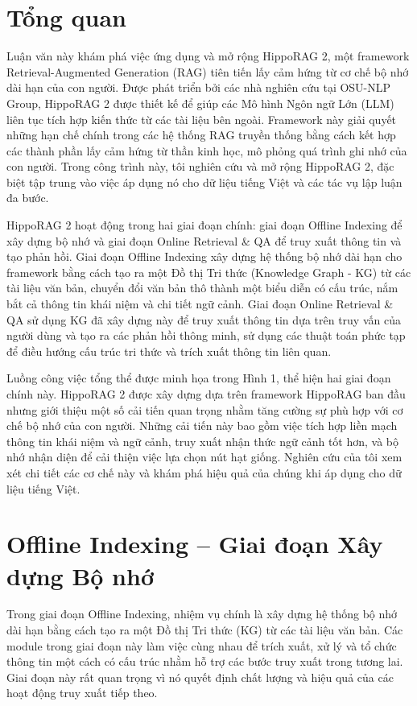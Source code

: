 \documentclass[../main.tex]{subfiles}
\begin{document}
\section{Tổng quan}
Luận văn này khám phá việc ứng dụng và mở rộng HippoRAG 2, một framework Retrieval-Augmented Generation (RAG) tiên tiến lấy cảm hứng từ cơ chế bộ nhớ dài hạn của con người. Được phát triển bởi các nhà nghiên cứu tại OSU-NLP Group, HippoRAG 2 được thiết kế để giúp các Mô hình Ngôn ngữ Lớn (LLM) liên tục tích hợp kiến thức từ các tài liệu bên ngoài. Framework này giải quyết những hạn chế chính trong các hệ thống RAG truyền thống bằng cách kết hợp các thành phần lấy cảm hứng từ thần kinh học, mô phỏng quá trình ghi nhớ của con người. Trong công trình này, tôi nghiên cứu và mở rộng HippoRAG 2, đặc biệt tập trung vào việc áp dụng nó cho dữ liệu tiếng Việt và các tác vụ lập luận đa bước.

HippoRAG 2 hoạt động trong hai giai đoạn chính: giai đoạn Offline Indexing để xây dựng bộ nhớ và giai đoạn Online Retrieval \& QA để truy xuất thông tin và tạo phản hồi. Giai đoạn Offline Indexing xây dựng hệ thống bộ nhớ dài hạn cho framework bằng cách tạo ra một Đồ thị Tri thức (Knowledge Graph - KG) từ các tài liệu văn bản, chuyển đổi văn bản thô thành một biểu diễn có cấu trúc, nắm bắt cả thông tin khái niệm và chi tiết ngữ cảnh. Giai đoạn Online Retrieval \& QA sử dụng KG đã xây dựng này để truy xuất thông tin dựa trên truy vấn của người dùng và tạo ra các phản hồi thông minh, sử dụng các thuật toán phức tạp để điều hướng cấu trúc tri thức và trích xuất thông tin liên quan.

Luồng công việc tổng thể được minh họa trong Hình 1, thể hiện hai giai đoạn chính này. HippoRAG 2 được xây dựng dựa trên framework HippoRAG ban đầu nhưng giới thiệu một số cải tiến quan trọng nhằm tăng cường sự phù hợp với cơ chế bộ nhớ của con người. Những cải tiến này bao gồm việc tích hợp liền mạch thông tin khái niệm và ngữ cảnh, truy xuất nhận thức ngữ cảnh tốt hơn, và bộ nhớ nhận diện để cải thiện việc lựa chọn nút hạt giống. Nghiên cứu của tôi xem xét chi tiết các cơ chế này và khám phá hiệu quả của chúng khi áp dụng cho dữ liệu tiếng Việt.

\section{Offline Indexing – Giai đoạn Xây dựng Bộ nhớ}
Trong giai đoạn Offline Indexing, nhiệm vụ chính là xây dựng hệ thống bộ nhớ dài hạn bằng cách tạo ra một Đồ thị Tri thức (KG) từ các tài liệu văn bản. Các module trong giai đoạn này làm việc cùng nhau để trích xuất, xử lý và tổ chức thông tin một cách có cấu trúc nhằm hỗ trợ các bước truy xuất trong tương lai. Giai đoạn này rất quan trọng vì nó quyết định chất lượng và hiệu quả của các hoạt động truy xuất tiếp theo.
\end{document}

